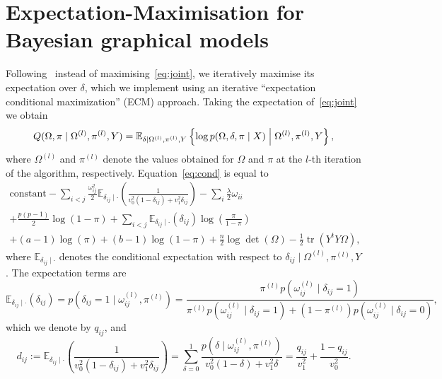 \documentclass[a4paper, 11pt, oneside]{report}
\DeclareMathOperator{\tr}{tr}
\newcommand{\E}{\mathbb{E}}
\newcommand{\1}{\mathds{1}}
\newcommand{\powl}{^{(l)}}
\begin{document}
\section{Expectation-Maximisation for Bayesian graphical models}
Following~\citet{limcco-2017} instead of maximising~\eqref{eq:joint}, we
iteratively maximise its expectation over $\delta$, which we implement using an iterative ``expectation conditional maximization'' (ECM) approach. Taking the expectation
of~\eqref{eq:joint} we obtain
\begin{equation}\label{eq:cond}
	Q(\Omega, \pi \mid \Omega\powl, \pi\powl, Y) = \mathbb{E}_{\delta \mid
		\Omega\powl, \pi\powl, Y}\left\{\log p(\Omega, \delta, \pi \mid X) \Bigm\vert
	\Omega\powl, \pi\powl, Y\right\},
\end{equation}
where $\Omega\powl$ and $\pi\powl$ denote the values obtained for $\Omega$ and
$\pi$ at the $l$-th iteration of the algorithm, respectively.
Equation~\eqref{eq:cond} is equal to
\begin{multline}
	\text{constant} - \sum_{i<j} \frac{\omega_{ij}^2}{2} \E_{\delta_{ij} \mid
		\cdot}\left(\frac{1}{v_0^2 (1 - \delta_{ij}) + v_1^2 \delta_{ij}}\right) -
	\sum_i \frac{\lambda}{2} \omega_{ii}
	\\
	+ \frac{p(p-1)}{2}  \log(1 - \pi) + \sum_{i<j} \E_{\delta_{ij} \mid
		\cdot}(\delta_{ij}) \log\left(\frac{\pi}{1-\pi}\right)
	\\
	+ (a - 1) \log(\pi) + (b - 1) \log(1 - \pi)
	+ \frac{n}{2} \log\det(\Omega) - \frac{1}{2} \tr(Y^t Y \Omega),
\end{multline}
where $\mathbb{E}_{\delta_{ij} \mid \cdot}$ denotes the conditional expectation with respect
to $\delta_{ij} \mid \Omega\powl, \pi\powl, Y$.
The expectation terms are
\begin{equation}\label{eq:qij}
	\E_{\delta_{ij} \mid \cdot}(\delta_{ij}) = p\left(\delta_{ij} = 1 \mid \omega_{ij}\powl, \pi\powl\right)
	= \frac{ \pi\powl p\left(\omega_{ij}\powl \mid \delta_{ij} = 1\right)}{\pi\powl p\left(\omega_{ij}\powl \mid \delta_{ij} = 1\right) +
		\left(1 - \pi\powl\right) p\left(\omega_{ij}\powl \mid \delta_{ij} = 0\right)},
\end{equation}
which we denote by $q_{ij}$, and
\begin{equation}\label{eq:dij}
	d_{ij} := \E_{\delta_{ij} \mid \cdot}\left(\frac{1}{v_0^2 (1 -
			\delta_{ij}) + v_1^2 \delta_{ij}}\right) = \sum_{\delta = 0}^1
	\frac{p\left(\delta \mid \omega_{ij}\powl, \pi\powl\right)}{v_0^2 (1 - \delta) +
		v_1^2 \delta} = \frac{q_{ij}}{v_1^2} + \frac{1 - q_{ij}}{v_0^2}.
\end{equation}
\end{document}
